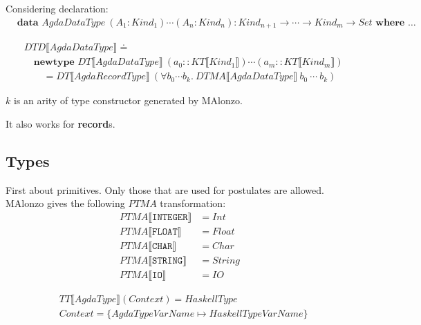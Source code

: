 Considering declaration:
\begin{align*}
   &\textbf{data } AgdaDataType\ (A_1 : Kind_1) \cdots (A_n : Kind_n) :
      Kind_{n+1} \rightarrow \cdots \rightarrow Kind_{m} \rightarrow Set \textbf{ where } \ldots
\end{align*}

\begin{align*}
   &DTD\llbracket AgdaDataType \rrbracket \doteq\\
   &\quad\textbf{newtype } DT\llbracket AgdaDataType \rrbracket\ (a_0 :: KT\llbracket Kind_1 \rrbracket)
      \cdots (a_m :: KT\llbracket Kind_m \rrbracket)\\
   &\quad\quad = DT\llbracket AgdaRecordType \rrbracket\ (\forall b_0 \cdots b_k.\ DTMA\llbracket AgdaDataType \rrbracket\ b_0\ \cdots\ b_k)
\end{align*}

\(k\) is an arity of type constructor generated by MAlonzo.

It also works for \textbf{record}s.

\subsection{Types}

First about primitives. Only those that are used for postulates are allowed.
MAlonzo gives the following \(PTMA\) transformation:
\begin{align*}
   PTMA\llbracket \texttt{INTEGER} \rrbracket &= Int\\
   PTMA\llbracket \texttt{FLOAT} \rrbracket &= Float\\
   PTMA\llbracket \texttt{CHAR} \rrbracket &= Char\\
   PTMA\llbracket \texttt{STRING} \rrbracket &= String\\
   PTMA\llbracket \texttt{IO} \rrbracket &= IO
\end{align*}

\begin{align*}
   &TT\llbracket AgdaType \rrbracket(Context) = HaskellType\\
   &Context = \{ AgdaTypeVarName \mapsto HaskellTypeVarName \}
\end{align*}

